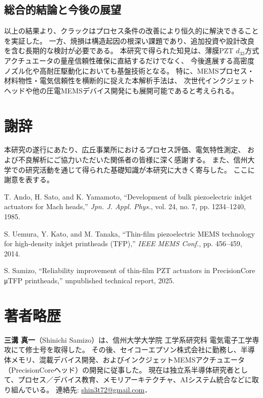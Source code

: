 \documentclass[conference]{IEEEtran}
\begin{document}
\subsection{総合的結論と今後の展望}
以上の結果より、クラックはプロセス条件の改善により恒久的に解決できることを実証した。
一方、焼損は構造起因の根深い課題であり、追加投資や設計改良を含む長期的な検討が必要である。
本研究で得られた知見は、薄膜PZT $d_{33}$方式アクチュエータの量産信頼性確保に直結するだけでなく、
今後進展する高密度ノズル化や高耐圧駆動化においても基盤技術となる。
特に、MEMSプロセス・材料物性・電気信頼性を横断的に捉えた本解析手法は、
次世代インクジェットヘッドや他の圧電MEMSデバイス開発にも展開可能であると考えられる。

\section*{謝辞}
本研究の遂行にあたり、広丘事業所におけるプロセス評価、電気特性測定、  
および不良解析にご協力いただいた関係者の皆様に深く感謝する。  
また、信州大学での研究活動を通じて得られた基礎知識が本研究に大きく寄与した。  
ここに謝意を表する。

\begin{thebibliography}{99}

T. Ando, H. Sato, and K. Yamamoto, 
``Development of bulk piezoelectric inkjet actuators for Mach heads,'' 
\textit{Jpn. J. Appl. Phys.}, vol. 24, no. 7, pp. 1234--1240, 1985.

S. Uemura, Y. Kato, and M. Tanaka, 
``Thin-film piezoelectric MEMS technology for high-density inkjet printheads (TFP),'' 
\textit{IEEE MEMS Conf.}, pp. 456--459, 2014.

S. Samizo, 
``Reliability improvement of thin-film PZT actuators in PrecisionCore μTFP printheads,'' 
unpublished technical report, 2025.

\end{thebibliography}

\section*{著者略歴}
\textbf{三溝 真一}（Shinichi Samizo）は、信州大学大学院 工学系研究科 電気電子工学専攻にて修士号を取得した。  
その後、セイコーエプソン株式会社に勤務し、半導体メモリ、混載デバイス開発、およびインクジェットMEMSアクチュエータ（PrecisionCoreヘッド）の開発に従事した。  
現在は独立系半導体研究者として、プロセス／デバイス教育、メモリアーキテクチャ、AIシステム統合などに取り組んでいる。  
連絡先: \href{mailto:shin3t72@gmail.com}{shin3t72@gmail.com}．
\end{document}
